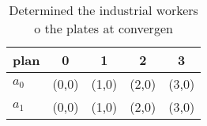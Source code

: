\documentclass[a4paper]{article}
\begin{document}
\begin{table}
\begin{adjustbox}{width=0.5\columnwidth}
\begin{tabular}{|l|l|l|l|l|}
\hline
\textbf{plan} & \multicolumn{1}{c|}{\textbf{0}} & \multicolumn{1}{c|}{\textbf{1}} & \multicolumn{1}{c|}{\textbf{2}} & \multicolumn{1}{c|}{\textbf{3}} \\ \hline
\textbf{$a_0$}  & (0,0) & (1,0) & (2,0) & (3,0) \\ \hline
\textbf{$a_1$}  & (0,0) & (1,0) & (2,0) & (3,0) \\ \hline
\end{tabular}
\end{adjustbox}
\caption{Determined the industrial workers o the plates at convergen
}
\end{table}
\end{document}
